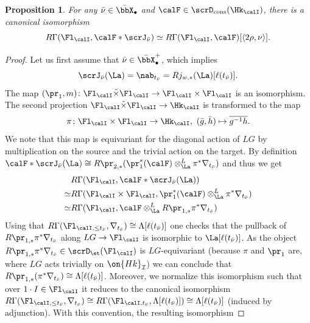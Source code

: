 \documentclass[10pt, reqno]{amsart}
\theoremstyle{plain}
\newtheorem{proposition}[theorem]{Proposition}
\theoremstyle{definition}
\numberwithin{equation}{section}
\begin{document}
	\begin{proposition} \label{owieuroieq[p[pp}
		For any $\bar \nu\in\bar \bbX_\bullet$ and $\calF\in \scrD_{\mathrm{cons}}(\Hk_\calI)$, there is a canonical isomorphism
		\begin{equation}
			R\Gamma(\Fl_\calI,\calF\ast \scrJ_{\bar\nu})\simeq R\Gamma(\Fl_\calI,\calF)[\langle 2\rho, \nu\rangle].
		\end{equation} 
		
	\end{proposition}
	\begin{proof}
		Let us first assume that $\bar \nu\in \bar\bbX_\bullet^+$, which implies
		\begin{equation}
			\scrJ_{\bar\nu}(\La)=\nab_{t_{\bar\nu}}=Rj_{w,\ast}(\La)[\ell(t_{\bar\nu})].
		\end{equation}
		The map $(\pr_1,m)\colon \Fl_\calI\tilde{\times} \Fl_\calI\to \Fl_\calI\times \Fl_\calI$ is an isomorphism. The second projection $\Fl_\calI\tilde\times \Fl_\calI\to \Hk_{\calI}$ is transformed to the map
		\begin{equation}
			\pi\colon \Fl_\calI\times \Fl_\calI\to \Hk_{\calI},\ (\bar g, \bar h)\mapsto \overline{g^{-1}h}.
		\end{equation}
		We note that this map is equivariant for the diagonal action of $LG$ by multiplication on the source and the trivial action on the target.
		By definition $\calF\ast \scrJ_{{\bar{\nu}}}(\La)\cong R\pr_{2,\ast}(\pr_1^\ast(\calF)\otimes^L_\La \pi^\ast \nabla_{t_{\bar{\nu}}})$ and thus we get
		\begin{align*}
			& R\Gamma(\Fl_\calI, \calF\ast \scrJ_{{\bar{\nu}}}(\La)) \\
			\simeq & R\Gamma(\Fl_\calI\times \Fl_\calI, \pr_1^\ast(\calF)\otimes^L_\La \pi^\ast \nabla_{t_{\bar{\nu}}}) \\
			\simeq & R\Gamma(\Fl_\calI,\calF \otimes^L_\La R\pr_{1,\ast} \pi^\ast \nabla_{t_{\bar{\nu}}}) 
		\end{align*}
		Using that $R\Gamma(\Fl_{\calI,\leq t_{\bar\nu}}, \nabla_{t_{\bar\nu}})\cong \Lambda[\ell(t_{\bar\nu})]$ one checks that the pullback of $R\pr_{1,\ast}\pi^\ast\nabla_{t_{\bar\nu}}$ along $LG \to \Fl_{ \calI}$ is isomorphic to $\La[\ell(t_{\bar\nu})]$. As the object $R\pr_{1,\ast}\pi^\ast\nabla_{t_{\bar\nu}}\in \scrD_\et(\Fl_\calI)$ is $LG$-equivariant (because $\pi$ and $\pr_1$ are, where $LG$ acts trivially on $\on{Hk}_{\mathcal{I}}$) we can conclude that $R\pr_{1,\ast}(\pi^\ast\nabla_{t_{\bar\nu}})\cong \Lambda[\ell(t_{\bar\nu})]$. Moreover, we normalize this isomorphism such that over $1\cdot I\in \Fl_{\calI}$ it reduces to the canonical isomorphism $R\Gamma(\Fl_{\calI,\leq t_{\bar\nu}}, \nabla_{t_{\bar\nu}})\cong R\Gamma(\Fl_{\calI, t_{\bar\nu}},\Lambda[\ell(t_{\bar\nu})])\cong \Lambda[\ell(t_{\bar\nu})]$ (induced by adjunction). With this convention, the resulting isomorphism

\end{proof}
\end{document}
